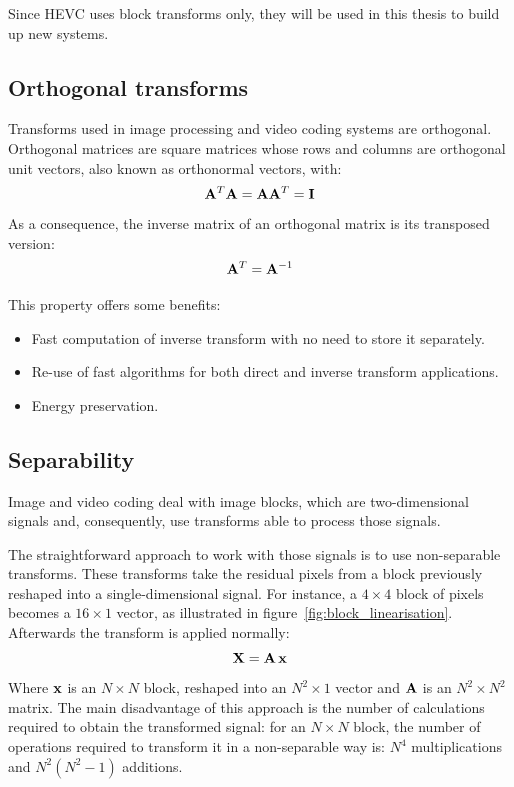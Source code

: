 \documentclass[11pt,a4paper,openright,twoside]{book}
\numberwithin{equation}{section} %
\numberwithin{figure}{section} %
\numberwithin{table}{section} %
\begin{document}
Since \ac{HEVC} uses block transforms only, they will be used in this thesis
to build up new systems.

\subsection{Orthogonal transforms}
\label{sub:orthogonal_transforms}

Transforms used in image processing and video coding systems are orthogonal.
Orthogonal matrices are square matrices whose rows and columns are orthogonal
unit vectors, also known as orthonormal vectors, with:
\begin{equation}
	\mathbf{A}^T\mathbf{A} = \mathbf{A}\mathbf{A}^T = \mathbf{I}
\end{equation}
As a consequence, the inverse matrix of an orthogonal matrix is its
transposed version:
\begin{equation}
	\mathbf{A}^T = \mathbf{A}^{-1}
\end{equation}

This property offers some benefits:
\begin{itemize}
	\item Fast computation of inverse transform with no need to store it
		separately.
	\item Re-use of fast algorithms for both direct and inverse transform
		applications.
	\item Energy preservation.
\end{itemize}

\subsection{Separability}
\label{sub:separability}

Image and video coding deal with image blocks, which are two-dimensional
signals and, consequently, use transforms able to process those signals.

The straightforward approach to work with those signals is to use
non-separable transforms.
These transforms take the residual pixels from a block previously reshaped
into a single-dimensional signal.
For instance, a $4\times4$ block of pixels becomes a $16\times1$ vector, as
illustrated in figure~\ref{fig:block_linearisation}.
Afterwards the transform is applied normally:
\begin{equation}
	\mathbf{X} = \mathbf{A} \, \mathbf{x}
\end{equation}
Where $\mathbf{x}$ is an $N \times N$ block, reshaped into an $N^2\times1$ vector
and $\mathbf{A}$ is an $N^2 \times N^2$ matrix.
The main disadvantage of this approach is the number of calculations
required to obtain the transformed signal: for an $N \times N$ block, the
number of operations required to transform it in a non-separable way is:
$N^4$ multiplications and $N^2(N^2-1)$ additions.
\end{document}
